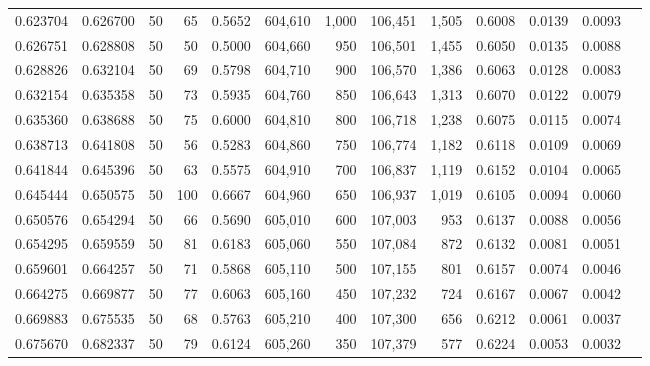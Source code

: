 \begin{tabular}{rrrrrrrrrrrrr}
0.623704 & 0.626700 &    50 &  65 &                                     0.5652 & 604,610 &   1,000 & 106,451 &   1,505 & 0.6008 & 0.0139 & 0.0093 \\
0.626751 & 0.628808 &    50 &  50 &                                     0.5000 & 604,660 &     950 & 106,501 &   1,455 & 0.6050 & 0.0135 & 0.0088 \\
0.628826 & 0.632104 &    50 &  69 &                                     0.5798 & 604,710 &     900 & 106,570 &   1,386 & 0.6063 & 0.0128 & 0.0083 \\
0.632154 & 0.635358 &    50 &  73 &                                     0.5935 & 604,760 &     850 & 106,643 &   1,313 & 0.6070 & 0.0122 & 0.0079 \\
0.635360 & 0.638688 &    50 &  75 &                                     0.6000 & 604,810 &     800 & 106,718 &   1,238 & 0.6075 & 0.0115 & 0.0074 \\
0.638713 & 0.641808 &    50 &  56 &                                     0.5283 & 604,860 &     750 & 106,774 &   1,182 & 0.6118 & 0.0109 & 0.0069 \\
0.641844 & 0.645396 &    50 &  63 &                                     0.5575 & 604,910 &     700 & 106,837 &   1,119 & 0.6152 & 0.0104 & 0.0065 \\
0.645444 & 0.650575 &    50 & 100 &                                     0.6667 & 604,960 &     650 & 106,937 &   1,019 & 0.6105 & 0.0094 & 0.0060 \\
0.650576 & 0.654294 &    50 &  66 &                                     0.5690 & 605,010 &     600 & 107,003 &     953 & 0.6137 & 0.0088 & 0.0056 \\
0.654295 & 0.659559 &    50 &  81 &                                     0.6183 & 605,060 &     550 & 107,084 &     872 & 0.6132 & 0.0081 & 0.0051 \\
0.659601 & 0.664257 &    50 &  71 &                                     0.5868 & 605,110 &     500 & 107,155 &     801 & 0.6157 & 0.0074 & 0.0046 \\
0.664275 & 0.669877 &    50 &  77 &                                     0.6063 & 605,160 &     450 & 107,232 &     724 & 0.6167 & 0.0067 & 0.0042 \\
0.669883 & 0.675535 &    50 &  68 &                                     0.5763 & 605,210 &     400 & 107,300 &     656 & 0.6212 & 0.0061 & 0.0037 \\
0.675670 & 0.682337 &    50 &  79 &                                     0.6124 & 605,260 &     350 & 107,379 &     577 & 0.6224 & 0.0053 & 0.0032 \\

\end{tabular}
